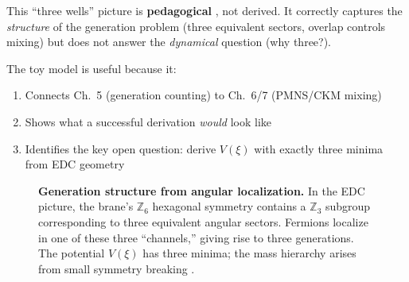 \begin{tcolorbox}[colback=yellow!5!white, colframe=yellow!60!black,
    title=\textbf{Toy Model Status}]
This ``three wells'' picture is \textbf{pedagogical} \tagP{}, not derived.
It correctly captures the \emph{structure} of the generation problem (three
equivalent sectors, overlap controls mixing) but does not answer the
\emph{dynamical} question (why three?).

The toy model is useful because it:
\begin{enumerate}[nosep]
    \item Connects Ch.~5 (generation counting) to Ch.~6/7 (PMNS/CKM mixing)
    \item Shows what a successful derivation \emph{would} look like
    \item Identifies the key open question: derive $V(\xi)$ with exactly
          three minima from EDC geometry
\end{enumerate}
\end{tcolorbox}

\begin{figure}[htbp]
\centering
{}
\caption{\textbf{Generation structure from angular localization.}
In the EDC picture, the brane's $\mathbb{Z}_6$ hexagonal symmetry contains a
$\mathbb{Z}_3$ subgroup corresponding to three equivalent angular sectors.
Fermions localize in one of these three ``channels,'' giving rise to three
generations. The potential $V(\xi)$ has three minima; the mass hierarchy
arises from small symmetry breaking \tagP{}.}
\label{fig:ch5_three_channels}
\end{figure}

